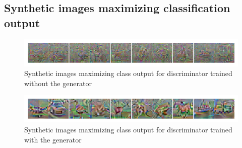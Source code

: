 \documentclass[15pt]{article}
\begin{document}
\subsection{Synthetic images maximizing classification output}

\begin{figure}[H]
\centering
\includegraphics[width=\textwidth]{../Visualization/max_class_no_generator}
\caption{Synthetic images maximizing class output for discriminator trained without the generator}
\end{figure}

\begin{figure}[H]
\centering
\includegraphics[width=\textwidth]{../Visualization/max_class_with_generator}
\caption{Synthetic images maximizing class output for discriminator trained with the generator}
\end{figure}
\end{document}
